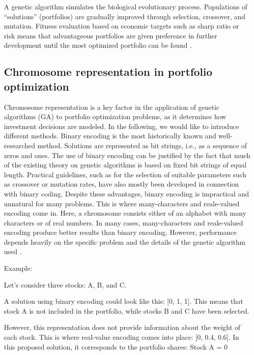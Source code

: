 \documentclass{agasthesis}
\begin{document}
A genetic algorithm simulates the biological evolutionary process. Populations of “solutions” (portfolios) are gradually improved through selection, 
crossover, and mutation. Fitness evaluation based on economic targets such as sharp ratio or risk means that advantageous portfolios are given 
preference in further development until the most optimized portfolio can be found \cite[p. 203-213]{soldatos_big_2022}.

\subsection{Chromosome representation in portfolio optimization}
Chromosome representation is a key factor in the application of genetic algorithms (GA) to portfolio optimization problems, as it determines how investment 
decisions are modeled. In the following, we would like to introduce different methods. Binary encoding is the most historically 
known and well-researched method. Solutions are represented as bit strings, i.e., as a sequence of zeros and ones. 
The use of binary encoding can be justified by the fact that much of the existing theory on genetic algorithms is based on fixed bit strings of equal length. 
Practical guidelines, such as for the selection of suitable parameters such as crossover or mutation rates, have also mostly been developed 
in connection with binary coding. Despite these advantages, binary encoding is impractical and unnatural for many problems. 
This is where many-characters and reale-valued encoding come in. Here, a chromosome consists either of an alphabet with many characters or of real numbers. 
In many cases, many-characters and reale-valued encoding produce better results than binary encoding. However, performance depends heavily on the specific 
problem and the details of the genetic algorithm used \cite[p. 117-118]{melanie_introduction_1999}.

Example:

Let's consider three stocks: A, B, and C.

A solution using binary encoding could look like this: [0, 1, 1]. This means that stock A is not included in the portfolio, 
while stocks B and C have been selected.

However, this representation does not provide information about the weight of each stock. This is where real-value encoding 
comes into place: [0, 0.4, 0.6]. In this proposed solution, it corresponds to the portfolio shares: Stock A = 0%
\end{document}
